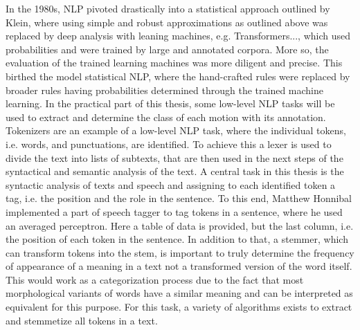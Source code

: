 In the 1980s, NLP pivoted drastically into a statistical approach outlined by Klein\cite{kleincs}, where using simple and robust approximations as outlined above was replaced by deep analysis with leaning machines, e.g. Transformers..., which used probabilities and were trained by large and annotated corpora. More so, the evaluation of the trained learning machines was more diligent and precise\cite{nadkarni2011natural}. This birthed the model statistical NLP, where the hand-crafted rules were replaced by broader rules having probabilities determined through the trained machine learning\cite{kleincs}. In the practical part of this thesis, some low-level NLP tasks will be used to extract and determine the class of each motion with its annotation. Tokenizers are an example of a low-level NLP task, where the individual tokens, i.e. words, and punctuations, are identified. To achieve this a lexer is used to divide the text into lists of subtexts, that are then used in the next steps of the syntactical and semantic analysis of the text.\newline
A central task in this thesis is the syntactic analysis of texts and speech and assigning to each identified token a tag, i.e. the position and the role in the sentence\cite{nadkarni2011natural}. To this end, Matthew Honnibal implemented a part of speech tagger to tag tokens in a sentence, where he used an averaged perceptron. Here a table of data is provided, but the last column, i.e. the position of each token in the sentence\cite{honnibal_2013}. In addition to that, a stemmer, which can transform tokens into the stem, is important to truly determine the frequency of appearance of a meaning in a text not a transformed version of the word itself. This would work as a categorization process due to the fact that most morphological variants of words have a similar meaning and can be interpreted as equivalent for this purpose\cite{jivani2011comparative}. For this task, a variety of algorithms exists to extract and stemmetize all tokens in a text. 
